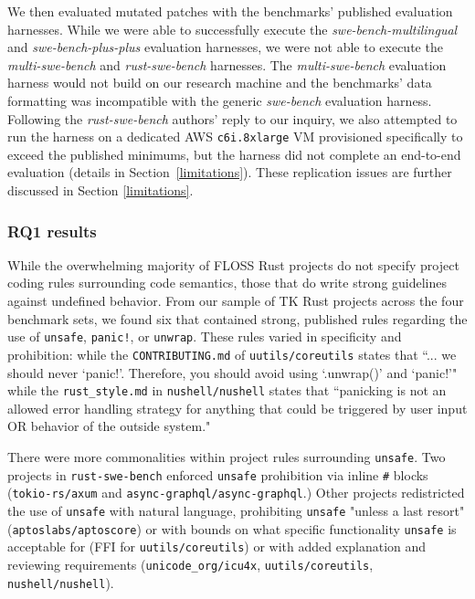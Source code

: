 \documentclass[10pt,conference, anon]{IEEEtran}
\begin{document}
We then evaluated mutated patches with the benchmarks' published evaluation harnesses. While we were able to successfully execute the \textit{swe-bench-multilingual} and \textit{swe-bench-plus-plus} evaluation harnesses, we were not able to execute the \textit{multi-swe-bench} and \textit{rust-swe-bench} harnesses. The \textit{multi-swe-bench} evaluation harness would not build on our research machine and the benchmarks' data formatting was incompatible with the generic \textit{swe-bench} evaluation harness. Following the \textit{rust-swe-bench} authors' reply to our inquiry, we also attempted to run the harness on a dedicated AWS \texttt{c6i.8xlarge} VM provisioned specifically to exceed the published minimums, but the harness did not complete an end-to-end evaluation (details in Section~\ref{limitations}). These replication issues are further discussed in Section \ref{limitations}.

\subsubsection{RQ1 results}

While the overwhelming majority of FLOSS Rust projects do not specify project coding rules surrounding code semantics, those that do write strong guidelines against undefined behavior. From our sample of TK Rust projects across the four benchmark sets, we found six that contained strong, published rules regarding the use of \texttt{unsafe}, \texttt{panic!}, or \texttt{unwrap}. These rules varied in specificity and prohibition: while the \texttt{CONTRIBUTING.md} of \texttt{uutils/coreutils} states that ``... we should never `panic!'. Therefore, you should avoid using `.unwrap()' and `panic!'" while the \texttt{rust\_style.md} in \texttt{nushell/nushell} states that ``panicking is not an allowed error handling strategy for anything that could be triggered by user input OR behavior of the outside system."

There were more commonalities within project rules surrounding \texttt{unsafe}. Two projects in \texttt{rust-swe-bench} enforced \texttt{unsafe} prohibition via inline \texttt{\#} blocks (\texttt{tokio-rs/axum} and \texttt{async-graphql/async-graphql}.) Other projects redistricted the use of \texttt{unsafe} with natural language, prohibiting \texttt{unsafe} "unless a last resort" (\texttt{aptoslabs/aptoscore}) or with bounds on what specific functionality \texttt{unsafe} is acceptable for (FFI for \texttt{uutils/coreutils}) or with added explanation and reviewing requirements (\texttt{unicode\_org/icu4x}, \texttt{uutils/coreutils}, \texttt{nushell/nushell}).
\end{document}
